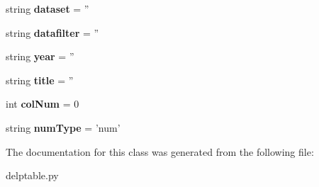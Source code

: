 \begin{DoxyCompactItemize}
\item 
\hypertarget{classdelptable_1_1Column_acbe5148d051246388708ed3b9c1c6086}{
string {\bfseries dataset} = ''}
\label{classdelptable_1_1Column_acbe5148d051246388708ed3b9c1c6086}

\item 
\hypertarget{classdelptable_1_1Column_acd0cd3fd061fdbde5247af93dd3ff43e}{
string {\bfseries datafilter} = ''}
\label{classdelptable_1_1Column_acd0cd3fd061fdbde5247af93dd3ff43e}

\item 
\hypertarget{classdelptable_1_1Column_ac436523ac132b179fa7c0f4a70be266b}{
string {\bfseries year} = ''}
\label{classdelptable_1_1Column_ac436523ac132b179fa7c0f4a70be266b}

\item 
\hypertarget{classdelptable_1_1Column_a994ca46e74d73883f1c19b21362da85e}{
string {\bfseries title} = ''}
\label{classdelptable_1_1Column_a994ca46e74d73883f1c19b21362da85e}

\item 
\hypertarget{classdelptable_1_1Column_ab9b85e871b1ff0118574bd4b1a567729}{
int {\bfseries colNum} = 0}
\label{classdelptable_1_1Column_ab9b85e871b1ff0118574bd4b1a567729}

\item 
\hypertarget{classdelptable_1_1Column_aeae0054dd42f6348de12fa59226dc58c}{
string {\bfseries numType} = 'num'}
\label{classdelptable_1_1Column_aeae0054dd42f6348de12fa59226dc58c}

\end{DoxyCompactItemize}


The documentation for this class was generated from the following file:\begin{DoxyCompactItemize}
\item 
delptable.py\end{DoxyCompactItemize}
